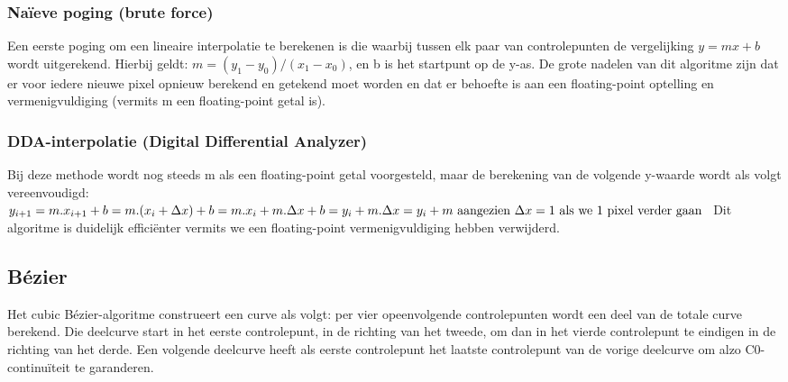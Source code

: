 \documentclass[a4paper,11pt,oneside, titlepage]{article}
\begin{document}
\subsubsection{Na\"ieve poging (brute force) \label{snp1}}
Een eerste poging om een lineaire interpolatie te berekenen is die waarbij tussen elk paar van controlepunten
de vergelijking \begin{math}y = mx + b\end{math} wordt uitgerekend.
Hierbij geldt: \begin{math}m = (y_1-y_0)/(x_1-x_0)\end{math}, en b is het
startpunt op de y-as. De grote nadelen van dit algoritme zijn dat er voor iedere nieuwe
pixel opnieuw berekend en getekend moet worden en dat er behoefte is aan een floating-point optelling en 
vermenigvuldiging (vermits m een floating-point getal is).
\subsubsection{DDA-interpolatie (Digital Differential Analyzer) \label{sdda}}
Bij deze methode wordt nog steeds m als een floating-point getal voorgesteld, maar de berekening van
de volgende y-waarde wordt als volgt vereenvoudigd:
\begin{math}
y_{i+1} = m.x_{i+1} + b\newline
= m.(x_i + \Delta x) + b\newline
= m.x_i + m.\Delta x + b\newline
= y_i + m.\Delta x\newline
= y_i + m \textrm{ aangezien } \Delta x = 1 \textrm{ als we 1 pixel verder gaan } \newline
\end{math}
Dit algoritme is duidelijk effici\"enter vermits we een floating-point vermenigvuldiging hebben 
verwijderd. 
\subsection{B\'ezier \label{sb}}
Het cubic Bézier-algoritme construeert een curve als volgt: per vier opeenvolgende controlepunten wordt een deel van de totale curve berekend.
Die deelcurve start in het eerste controlepunt, in de richting van het tweede, om dan in het vierde controlepunt te eindigen in de richting van het derde. Een volgende 
deelcurve heeft als eerste controlepunt het laatste controlepunt van de vorige deelcurve om alzo C0-continu\"iteit te garanderen.
\end{document}
